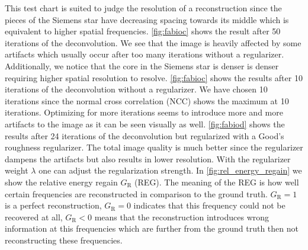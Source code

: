 \documentclass{juliacon}
\begin{document}
        This test chart is suited to judge the resolution of a reconstruction since the pieces of the Siemens star
        have decreasing spacing towards its middle which is equivalent to higher spatial frequencies.
        \autoref{fig:fabioc} shows the result after 50 iterations of the deconvolution. 
        We see that the image is heavily affected by some artifacts which usually occur after too many iterations without a regularizer.
        Additionally, we notice that the core in the Siemens star is denser is denser 
        requiring higher spatial resolution to resolve. 
        \autoref{fig:fabioc} shows the results after 10 iterations of the deconvolution without a regularizer.
        We have chosen 10 iterations since the normal cross correlation (NCC) shows the maximum at 10 iterations.
        Optimizing for more iterations seems to introduce more and more artifacts to the image as it can be seen visually as well.
        \autoref{fig:fabiod} shows the results after 24 iterations of the deconvolution but regularized with a Good's roughness regularizer.
        The total image quality is much better since the regularizer dampens the artifacts but also results in lower
        resolution. With the regularizer weight $\lambda$ one can adjust the regularization strength.
        In \autoref{fig:rel_energy_regain} we show the relative energy regain $G_\textrm{R}$ \cite{rel_energy_regain} (REG).
        The meaning of the REG is how well certain frequencies are reconstructed in comparison
        to the ground truth. $G_\textrm{R} = 1$ is a perfect reconstruction, $G_\textrm{R} = 0$ indicates that 
        this frequency could not be recovered at all, $G_\textrm{R} < 0$ means that the reconstruction introduces 
        wrong information at this frequencies
        which are further from the ground truth then not reconstructing these frequencies. 
\end{document}
